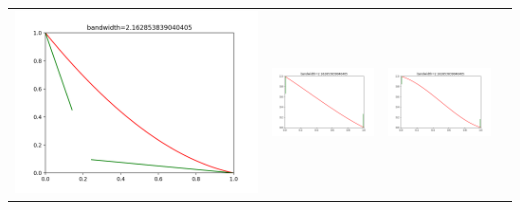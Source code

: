 \documentclass[a4 paper,12pt]{article}
\begin{document}
\begin{table}[h]
   \centering
   \begin{tabular}{ c c c c}
   \includegraphics[scale=0.2]{case41_frame0000035.png}
   &
   \includegraphics[scale=0.24]{casez01_frame0000035.png}
   &
   \includegraphics[scale=0.24]{casez11_frame0000035.png}

\end{tabular}
\end{table}
\end{document}
